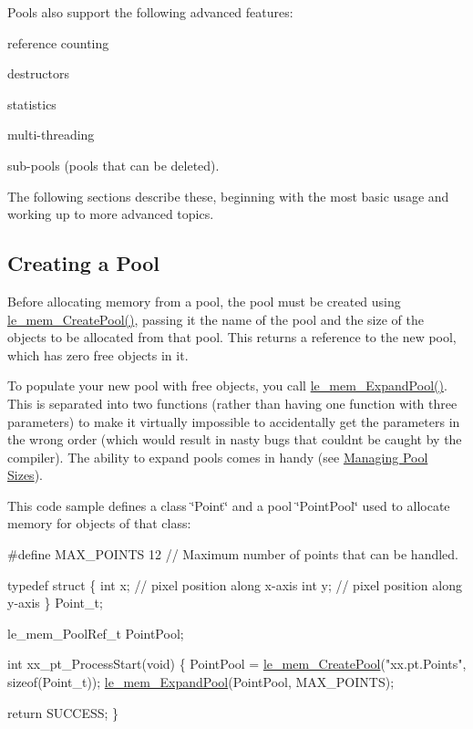 Pools also support the following advanced features\+:
\begin{DoxyItemize}
\item reference counting
\item destructors
\item statistics
\item multi-\/threading
\item sub-\/pools (pools that can be deleted).
\end{DoxyItemize}

The following sections describe these, beginning with the most basic usage and working up to more advanced topics.\hypertarget{c_memory_mem_creating}{}\subsection{Creating a Pool}\label{c_memory_mem_creating}
Before allocating memory from a pool, the pool must be created using \hyperlink{le__mem_8h_ab91efaa2978c9c1c7b2427d25b33241c}{le\+\_\+mem\+\_\+\+Create\+Pool()}, passing it the name of the pool and the size of the objects to be allocated from that pool. This returns a reference to the new pool, which has zero free objects in it.

To populate your new pool with free objects, you call {\ttfamily \hyperlink{le__mem_8h_a79a4321ffa0345f267eaf3b7d3d3528a}{le\+\_\+mem\+\_\+\+Expand\+Pool()}}. This is separated into two functions (rather than having one function with three parameters) to make it virtually impossible to accidentally get the parameters in the wrong order (which would result in nasty bugs that couldn\textquotesingle{}t be caught by the compiler). The ability to expand pools comes in handy (see \hyperlink{c_memory_mem_pool_sizes}{Managing Pool Sizes}).

This code sample defines a class \char`\"{}\+Point\char`\"{} and a pool \char`\"{}\+Point\+Pool\char`\"{} used to allocate memory for objects of that class\+: 
\begin{DoxyCode}
\textcolor{preprocessor}{#define MAX\_POINTS 12  // Maximum number of points that can be handled.}

\textcolor{keyword}{typedef} \textcolor{keyword}{struct}
\{
    \textcolor{keywordtype}{int} x;  \textcolor{comment}{// pixel position along x-axis}
    \textcolor{keywordtype}{int} y;  \textcolor{comment}{// pixel position along y-axis}
\}
Point\_t;

le\_mem\_PoolRef\_t PointPool;

\textcolor{keywordtype}{int} xx\_pt\_ProcessStart(\textcolor{keywordtype}{void})
\{
    PointPool = \hyperlink{le__mem_8h_ab91efaa2978c9c1c7b2427d25b33241c}{le\_mem\_CreatePool}(\textcolor{stringliteral}{"xx.pt.Points"}, \textcolor{keyword}{sizeof}(Point\_t));
    \hyperlink{le__mem_8h_a79a4321ffa0345f267eaf3b7d3d3528a}{le\_mem\_ExpandPool}(PointPool, MAX\_POINTS);

    \textcolor{keywordflow}{return} SUCCESS;
\}
\end{DoxyCode}


